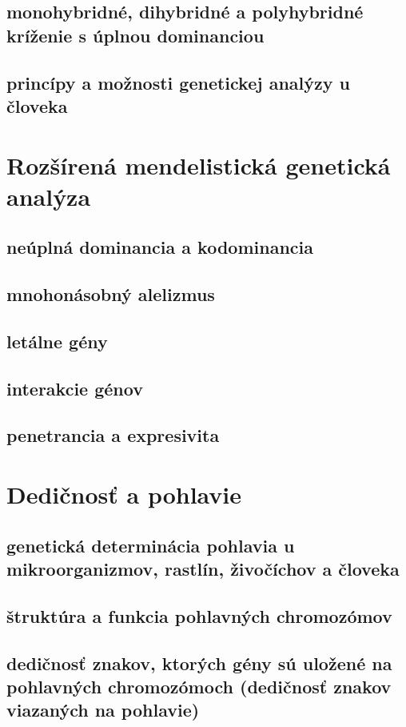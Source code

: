 \subsection{monohybridné, dihybridné a polyhybridné kríženie s úplnou dominanciou}
\subsection{princípy a možnosti genetickej analýzy u človeka}

\section{Rozšírená mendelistická genetická analýza}
\subsection{neúplná dominancia a kodominancia}
\subsection{mnohonásobný alelizmus}
\subsection{letálne gény}
\subsection{interakcie génov}
\subsection{penetrancia a expresivita}

\section{Dedičnosť a pohlavie}
\subsection{genetická determinácia pohlavia u mikroorganizmov, rastlín, živočíchov a človeka}
\subsection{štruktúra a funkcia pohlavných chromozómov}
\subsection{dedičnosť znakov, ktorých gény sú uložené na pohlavných chromozómoch (dedičnosť znakov viazaných na pohlavie)}
